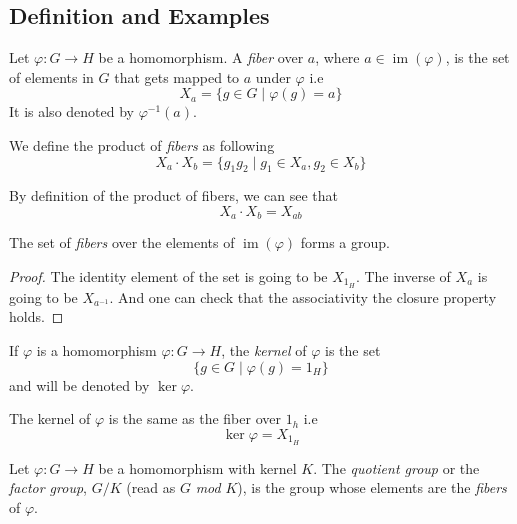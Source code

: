 \subsection{Definition and Examples}

\begin{definition}
    Let $\varphi : G \to H$ be a homomorphism. A \textit{fiber} over $a$, where $a \in \operatorname{im}(\varphi)$, is the set of elements 
    in $G$ that gets mapped to $a$ under $\varphi$ i.e 
    \[ X_a = \{ g \in G \mid \varphi(g)=a \} \]
    It is also denoted by $\varphi^{-1}(a)$.
\end{definition}


\begin{definition}
    We define the product of \textit{fibers} as following
    \[ X_a \cdot X_b = \{g_1 g_2 \mid g_1 \in X_a , g_2 \in X_b\} \]
\end{definition}

\begin{remark}
    By definition of the product of fibers, we can see that
    \[ X_a \cdot X_b = X_{ab} \]
\end{remark}

\begin{proposition}
    The set of \textit{fibers} over the elements of $\operatorname{im}(\varphi)$ forms a group. 
\end{proposition}

\begin{proof}
    The identity element of the set is going to be $X_{1_H}$. The inverse of $X_a$ is going to be $X_{a^{-1}}$. And one can check that
    the associativity the closure property holds.
\end{proof}

\begin{definition}
    If $\varphi$ is a homomorphism $\varphi : G \to H$, the \textit{kernel} of $\varphi$ is the set 
    \[ \{g \in G \mid \varphi(g)=1_H\} \]
    and will be denoted by $\ker \varphi$.
\end{definition}

\begin{remark}
    The kernel of $\varphi$ is the same as the fiber over $1_h$ i.e 
    \[ \ker \varphi = X_{1_H} \] 
\end{remark}

\begin{definition}
    Let $\varphi : G \to H$ be a homomorphism with kernel $K$. The \textit{quotient group} or the \textit{factor group}, $G/K$
    (read as $G$ \textit{mod} $K$), is the group whose elements are the \textit{fibers} of $\varphi$. 
\end{definition}



